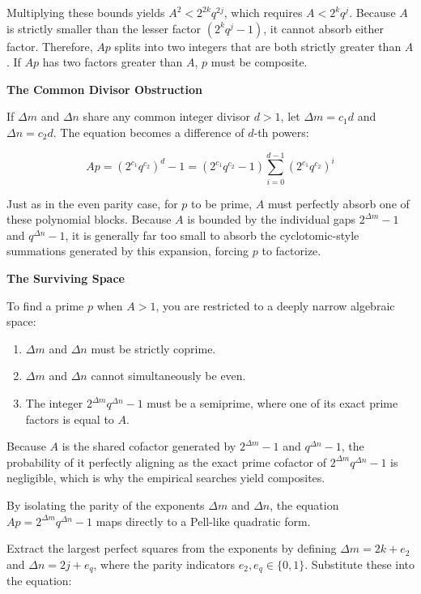 \documentclass{article}
\begin{document}
Multiplying these bounds yields $A^2 < 2^{2k} q^{2j}$, which requires $A < 2^k q^j$.
Because $A$ is strictly smaller than the lesser factor $(2^k q^j - 1)$, it cannot absorb either factor. Therefore, $Ap$ splits into two integers that are both strictly greater than $A$. If $Ap$ has two factors greater than $A$, $p$ must be composite.

\textbf{The Common Divisor Obstruction}

If $\Delta m$ and $\Delta n$ share any common integer divisor $d > 1$, let $\Delta m = c_1 d$ and $\Delta n = c_2 d$. The equation becomes a difference of $d$-th powers:

$$Ap = (2^{c_1} q^{c_2})^d - 1 = (2^{c_1} q^{c_2} - 1) \sum_{i=0}^{d-1} (2^{c_1} q^{c_2})^i$$

Just as in the even parity case, for $p$ to be prime, $A$ must perfectly absorb one of these polynomial blocks. Because $A$ is bounded by the individual gaps $2^{\Delta m}-1$ and $q^{\Delta n}-1$, it is generally far too small to absorb the cyclotomic-style summations generated by this expansion, forcing $p$ to factorize.

\textbf{The Surviving Space}

To find a prime $p$ when $A > 1$, you are restricted to a deeply narrow algebraic space:

\begin{enumerate}
    \item $\Delta m$ and $\Delta n$ must be strictly coprime.
    \item $\Delta m$ and $\Delta n$ cannot simultaneously be even.
    \item The integer $2^{\Delta m} q^{\Delta n} - 1$ must be a semiprime, where one of its exact prime factors is equal to $A$.
\end{enumerate}

Because $A$ is the shared cofactor generated by $2^{\Delta m}-1$ and $q^{\Delta n}-1$, the probability of it perfectly aligning as the exact prime cofactor of $2^{\Delta m} q^{\Delta n} - 1$ is negligible, which is why the empirical searches yield composites.

By isolating the parity of the exponents $\Delta m$ and $\Delta n$, the equation $Ap = 2^{\Delta m} q^{\Delta n} - 1$ maps directly to a Pell-like quadratic form.

Extract the largest perfect squares from the exponents by defining $\Delta m = 2k + e_2$ and $\Delta n = 2j + e_q$, where the parity indicators $e_2, e_q \in \{0, 1\}$.
Substitute these into the equation:
\end{document}
